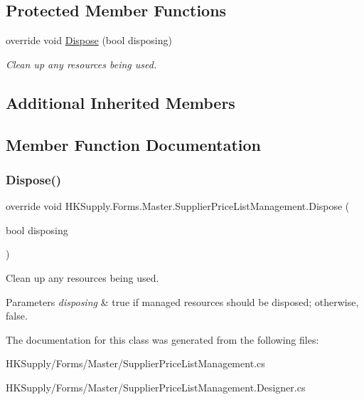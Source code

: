 \subsection*{Protected Member Functions}
\begin{DoxyCompactItemize}
\item 
override void \mbox{\hyperlink{class_h_k_supply_1_1_forms_1_1_master_1_1_supplier_price_list_management_ab6ae07e9f5e469cd185bba736f621135}{Dispose}} (bool disposing)
\begin{DoxyCompactList}\small\item\em Clean up any resources being used. \end{DoxyCompactList}\end{DoxyCompactItemize}
\subsection*{Additional Inherited Members}


\subsection{Member Function Documentation}
\mbox{\label{class_h_k_supply_1_1_forms_1_1_master_1_1_supplier_price_list_management_ab6ae07e9f5e469cd185bba736f621135}} 
\subsubsection{\texorpdfstring{Dispose()}{Dispose()}}
{\footnotesize\ttfamily override void H\+K\+Supply.\+Forms.\+Master.\+Supplier\+Price\+List\+Management.\+Dispose (\begin{DoxyParamCaption}\item[{bool}]{disposing }\end{DoxyParamCaption})\hspace{0.3cm}{\ttfamily [protected]}}



Clean up any resources being used. 


\begin{DoxyParams}{Parameters}
{\em disposing} & true if managed resources should be disposed; otherwise, false.\\
\hline
\end{DoxyParams}


The documentation for this class was generated from the following files\+:\begin{DoxyCompactItemize}
\item 
H\+K\+Supply/\+Forms/\+Master/Supplier\+Price\+List\+Management.\+cs\item 
H\+K\+Supply/\+Forms/\+Master/Supplier\+Price\+List\+Management.\+Designer.\+cs\end{DoxyCompactItemize}
